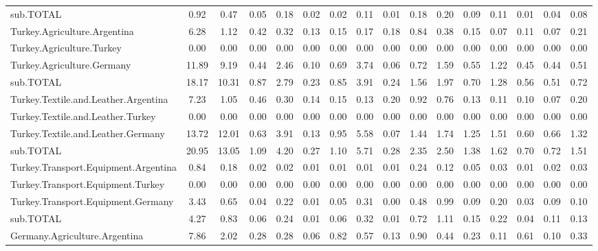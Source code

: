 \documentclass{article}\usepackage[]{graphicx}\usepackage[]{color}
\begin{document}
\begin{landscape}
\begin{table}[htbp]
\begin{adjustwidth}{-1.15in}{-1.15in}
\begin{tabular}{lccccccccccccccc}
    sub.TOTAL & 0.92  & 0.47  & 0.05  & 0.18  & 0.02  & 0.02  & 0.11  & 0.01  & 0.18  & 0.20  & 0.09  & 0.11  & 0.01  & 0.04  & 0.08 \\
    Turkey.Agriculture.Argentina & 6.28  & 1.12  & 0.42  & 0.32  & 0.13  & 0.15  & 0.17  & 0.18  & 0.84  & 0.38  & 0.15  & 0.07  & 0.11  & 0.07  & 0.21 \\
    Turkey.Agriculture.Turkey & 0.00  & 0.00  & 0.00  & 0.00  & 0.00  & 0.00  & 0.00  & 0.00  & 0.00  & 0.00  & 0.00  & 0.00  & 0.00  & 0.00  & 0.00 \\
    Turkey.Agriculture.Germany & 11.89 & 9.19  & 0.44  & 2.46  & 0.10  & 0.69  & 3.74  & 0.06  & 0.72  & 1.59  & 0.55  & 1.22  & 0.45  & 0.44  & 0.51 \\
    sub.TOTAL & 18.17 & 10.31 & 0.87  & 2.79  & 0.23  & 0.85  & 3.91  & 0.24  & 1.56  & 1.97  & 0.70  & 1.28  & 0.56  & 0.51  & 0.72 \\
    Turkey.Textile.and.Leather.Argentina & 7.23  & 1.05  & 0.46  & 0.30  & 0.14  & 0.15  & 0.13  & 0.20  & 0.92  & 0.76  & 0.13  & 0.11  & 0.10  & 0.07  & 0.20 \\
    Turkey.Textile.and.Leather.Turkey & 0.00  & 0.00  & 0.00  & 0.00  & 0.00  & 0.00  & 0.00  & 0.00  & 0.00  & 0.00  & 0.00  & 0.00  & 0.00  & 0.00  & 0.00 \\
    Turkey.Textile.and.Leather.Germany & 13.72 & 12.01 & 0.63  & 3.91  & 0.13  & 0.95  & 5.58  & 0.07  & 1.44  & 1.74  & 1.25  & 1.51  & 0.60  & 0.66  & 1.32 \\
    sub.TOTAL & 20.95 & 13.05 & 1.09  & 4.20  & 0.27  & 1.10  & 5.71  & 0.28  & 2.35  & 2.50  & 1.38  & 1.62  & 0.70  & 0.72  & 1.51 \\
    Turkey.Transport.Equipment.Argentina & 0.84  & 0.18  & 0.02  & 0.02  & 0.01  & 0.01  & 0.01  & 0.01  & 0.24  & 0.12  & 0.05  & 0.03  & 0.01  & 0.02  & 0.03 \\
    Turkey.Transport.Equipment.Turkey & 0.00  & 0.00  & 0.00  & 0.00  & 0.00  & 0.00  & 0.00  & 0.00  & 0.00  & 0.00  & 0.00  & 0.00  & 0.00  & 0.00  & 0.00 \\
    Turkey.Transport.Equipment.Germany & 3.43  & 0.65  & 0.04  & 0.22  & 0.01  & 0.05  & 0.31  & 0.00  & 0.48  & 0.99  & 0.09  & 0.20  & 0.03  & 0.09  & 0.10 \\
    sub.TOTAL & 4.27  & 0.83  & 0.06  & 0.24  & 0.01  & 0.06  & 0.32  & 0.01  & 0.72  & 1.11  & 0.15  & 0.22  & 0.04  & 0.11  & 0.13 \\
    Germany.Agriculture.Argentina & 7.86  & 2.02  & 0.28  & 0.28  & 0.06  & 0.82  & 0.57  & 0.13  & 0.90  & 0.44  & 0.23  & 0.11  & 0.61  & 0.10  & 0.33 \\

\end{tabular}
\end{adjustwidth}
\end{table}
\end{landscape}
\end{document}
